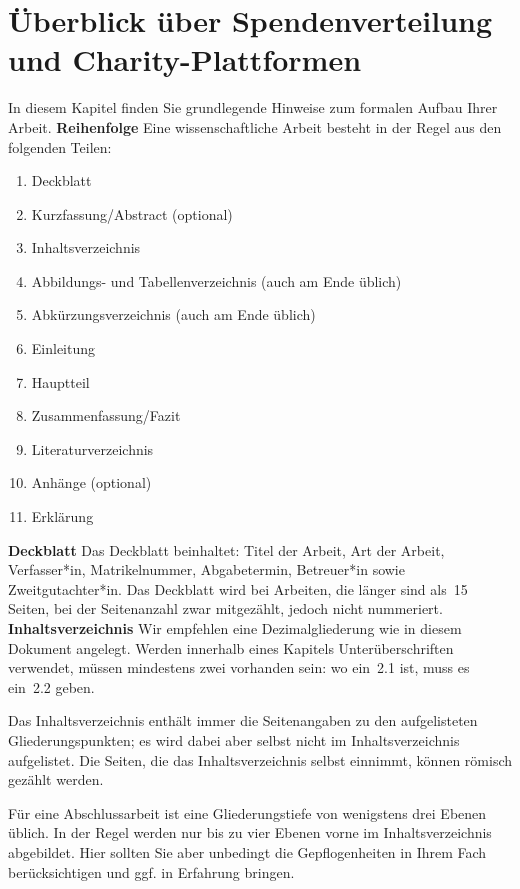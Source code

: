 \section{Überblick über Spendenverteilung und Charity-Plattformen}
\label{chap:formal}
%
In diesem Kapitel finden Sie grundlegende Hinweise zum formalen Aufbau Ihrer Arbeit.
%
\textbf{Reihenfolge}
\label{sec:aufbau}
Eine wissenschaftliche Arbeit besteht in der Regel aus den folgenden Teilen:
%
\begin{enumerate}
 \item Deckblatt
 \item Kurzfassung/Abstract (optional)
 \item Inhaltsverzeichnis
 \item Abbildungs- und Tabellenverzeichnis (auch am Ende üblich)
 \item Abkürzungsverzeichnis (auch am Ende üblich)
 \item Einleitung
 \item Hauptteil
 \item Zusammenfassung/Fazit
 \item Literaturverzeichnis
 \item Anhänge (optional)
 \item Erklärung
\end{enumerate}
%
%
\textbf{Deckblatt}
Das Deckblatt beinhaltet: Titel der Arbeit, Art der Arbeit, Verfasser*in, Matrikelnummer, Abgabetermin, Betreuer*in sowie Zweitgutachter*in. Das Deckblatt wird bei Arbeiten, die länger sind als~15 Seiten, bei der Seitenanzahl zwar mitgezählt, jedoch nicht nummeriert.
%
%
\textbf{Inhaltsverzeichnis}
\label{sec:listOfContents}
Wir empfehlen eine Dezimalgliederung wie in diesem Dokument angelegt. Werden innerhalb eines Kapitels Unterüberschriften verwendet, müssen mindestens zwei vorhanden sein: wo ein~2.1 ist, muss es ein~2.2 geben.
\par
Das Inhaltsverzeichnis enthält immer die Seitenangaben zu den aufgelisteten Gliederungspunkten; es wird dabei aber selbst nicht im Inhaltsverzeichnis aufgelistet. Die Seiten, die das Inhaltsverzeichnis selbst einnimmt, können römisch gezählt werden.
\par
Für eine Abschlussarbeit ist eine Gliederungstiefe von wenigstens drei Ebenen üblich. In der Regel werden nur bis zu vier Ebenen vorne im Inhaltsverzeichnis abgebildet. Hier sollten Sie aber unbedingt die Gepflogenheiten in Ihrem Fach berücksichtigen und ggf. in Erfahrung bringen.
